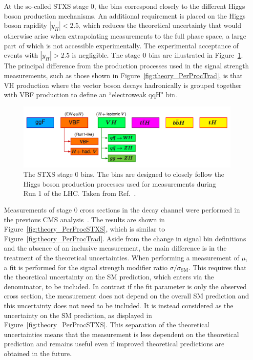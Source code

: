 At the so-called STXS stage 0, 
the bins correspond closely to the different Higgs boson production mechanisms.
An additional requirement is placed on the Higgs boson rapidity $|y_H| < 2.5$, 
which reduces the theoretical uncertainty 
that would otherwise arise when extrapolating measurements to the full phase space,
a large part of which is not accessible experimentally.
The experimental acceptance of \Hgg events with $|y_H| > 2.5$ is negligible.
The stage 0 bins are illustrated in Figure~\ref{fig:theory_stage0}.
The principal difference from the production processes used in the signal strength measurements,
such as those shown in Figure~\ref{fig:theory_PerProcTrad},
is that VH production where the vector boson decays hadronically is grouped together with 
VBF production to define an ``electroweak qqH" bin.

\begin{figure}[hptb]
  \centering
  \includegraphics[width=\textwidth]{Figures/Theory/stage0.png}
  \caption[Stage 0 STXS bins.]
  {
    The STXS stage 0 bins. 
    The bins are designed to closely follow the Higgs boson production processes
    used for measurements during Run 1 of the LHC.
    Taken from Ref.~\cite{YR4}.
  }
  \label{fig:theory_stage0}
\end{figure}

Measurements of stage 0 cross sections in the \Hgg decay channel 
were performed in the previous CMS \Hgg analysis~\cite{HIG-16-040}.
The results are shown in Figure~\ref{fig:theory_PerProcSTXS}, 
which is similar to Figure~\ref{fig:theory_PerProcTrad}.
Aside from the change in signal bin definitions and the absence of an inclusive measurement, 
the main difference is in the treatment of the theoretical uncertainties.
When performing a measurement of $\mu$, 
a fit is performed for the signal strength modifier ratio $\sigma/\sigma_{\textrm{SM}}$. 
This requires that the theoretical uncertainty on the SM prediction, 
which enters via the denominator, to be included.
In contrast if the fit parameter is only the observed cross section, 
the measurement does not depend on the overall SM prediction 
and this uncertainty does not need to be included.
It is instead considered as the uncertainty on the SM prediction, 
as displayed in Figure~\ref{fig:theory_PerProcSTXS}.
This separation of the theoretical uncertainties means that the measurement is less dependent 
on the theoretical prediction and remains useful 
even if improved theoretical predictions are obtained in the future.

